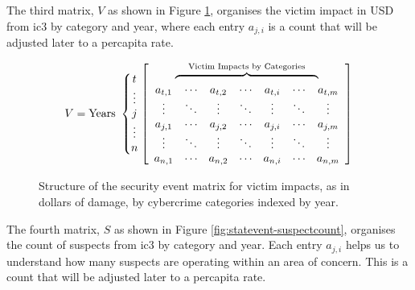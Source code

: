 The third \gls{matrix}, $V$ as shown in Figure \ref{fig:statevent-victimimpact}, organises the victim impact in USD from \gls{ic3} by category and year, where each entry $a_{j,i}$ is a count that will be adjusted later to a \gls{percapita} rate.
\begin{figure}[H]
  \centering
\[
V=
\text{Years }\left\{
\begin{matrix}
t\\ \vdots\\ j\\ \vdots\\ n
\end{matrix}
\right.
\left[
\begin{array}{ccccccc}
\multicolumn{7}{c}{%
  \overbrace{%
    \hphantom{a_{t,1}\ \cdots\ a_{t,2}\ \cdots\ a_{t,i}\ \cdots\ a_{t,m}}%
  }^{\text{Victim Impacts by Categories}}%
}\\
a_{t,1} & \cdots & a_{t,2} & \cdots & a_{t,i} & \cdots & a_{t,m} \\
\vdots  & \ddots & \vdots  & \ddots & \vdots  & \ddots & \vdots \\
a_{j,1} & \cdots & a_{j,2} & \cdots & a_{j,i} & \cdots & a_{j,m} \\
\vdots  & \ddots & \vdots  & \ddots & \vdots  & \ddots & \vdots \\
a_{n,1} & \cdots & a_{n,2} & \cdots & a_{n,i} & \cdots & a_{n,m}
\end{array}
\right]
\]


  \caption{Structure of the security event \gls{matrix} for victim impacts, as in dollars of damage, by  \gls{cybercrime} categories indexed by year.}
  \label{fig:statevent-victimimpact}
\end{figure}

The fourth \gls{matrix}, $S$ as shown in Figure \ref{fig:statevent-suspectcount}, organises the count of suspects from \gls{ic3} by category and year.  Each entry $a_{j,i}$ helps us to understand how many suspects are operating within an area of concern.  This is a count that will be adjusted later to a \gls{percapita} rate.

